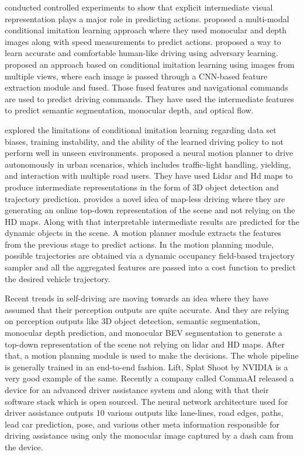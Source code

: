 \cite{DBLP:journals/corr/abs-1905-12887} conducted controlled experiments to show that explicit intermediate visual representation plays a major role in predicting actions. \cite{DBLP:journals/corr/abs-1906-03199} proposed a multi-modal conditional imitation learning approach where they used monocular and depth images along with speed measurements to predict actions. \cite{DBLP:journals/corr/abs-1903-10995} proposed a way to learn accurate and comfortable human-like driving using adversary learning. \cite{DBLP:journals/corr/abs-1912-00177} proposed an approach based on conditional imitation learning using images from multiple views, where each image is passed through a CNN-based feature extraction module and fused. Those fused features and navigational commands are used to predict driving commands. They have used the intermediate features to predict semantic segmentation, monocular depth, and optical flow. 


\cite{DBLP:journals/corr/abs-1904-08980} explored the limitations of conditional imitation learning regarding data set biases, training instability, and the ability of the learned driving policy to not perform well in unseen environments. \cite{DBLP:journals/corr/abs-2101-06679} proposed a neural motion planner to drive autonomously in urban scenarios, which includes traffic-light handling, yielding, and interaction with multiple road users. They have used Lidar and Hd maps to produce intermediate representations in the form of 3D object detection and trajectory prediction. \cite{Casas_2021_CVPR} provides a novel idea of map-less driving where they are generating an online top-down representation of the scene and not relying on the HD maps. Along with that interpretable intermediate results are predicted for the dynamic objects in the scene. A motion planner module extracts the features from the previous stage to predict actions. In the motion planning module, possible trajectories are obtained via a dynamic occupancy field-based trajectory sampler and all the aggregated features are passed into a cost function to predict the desired vehicle trajectory.  

Recent trends in self-driving are moving towards an idea where they have assumed that their perception outputs are quite accurate. And they are relying on perception outputs like 3D object detection, semantic segmentation, monocular depth prediction, and monocular BEV segmentation to generate a top-down representation of the scene not relying on lidar and HD maps. After that, a motion planning module is used to make the decisions. The whole pipeline is generally trained in an end-to-end fashion. Lift, Splat Shoot \cite{DBLP:journals/corr/abs-2008-05711} by NVIDIA is a very good example of the same. Recently a company called CommaAI released a device for an advanced driver assistance system and along with that their software stack which is open sourced. The neural network architecture used for driver assistance outputs 10 various outputs like lane-lines, road edges, paths, lead car prediction, pose, and various other meta information responsible for driving assistance using only the monocular image captured by a dash cam from the device. 

